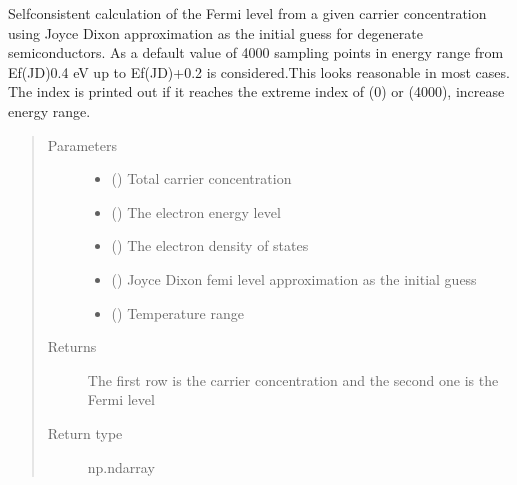\documentclass[letterpaper,10pt,english]{sphinxmanual}
\begin{document}
\begin{fulllineitems}
\label{\detokenize{autosummary/ThermoElectric.fermi_self_consistent:ThermoElectric.fermi_self_consistent}}
\sphinxAtStartPar
Self\sphinxhyphen{}consistent calculation of the Fermi level from a given carrier concentration
using Joyce Dixon approximation as the initial guess for degenerate semiconductors.
As a default value of 4000 sampling points in energy range from Ef(JD)\sphinxhyphen{}0.4 eV up to
Ef(JD)+0.2 is considered.This looks reasonable in most cases. The index is printed out
if it reaches the extreme index of (0) or (4000), increase energy range.
\begin{quote}\begin{description}
\item[{Parameters}] \leavevmode\begin{itemize}
\item {} 
\sphinxAtStartPar
{} () \textendash{} Total carrier concentration

\item {} 
\sphinxAtStartPar
{} () \textendash{} The electron energy level

\item {} 
\sphinxAtStartPar
{} () \textendash{} The electron density of states

\item {} 
\sphinxAtStartPar
{} () \textendash{} Joyce Dixon femi level approximation as the initial guess

\item {} 
\sphinxAtStartPar
{} () \textendash{} Temperature range

\end{itemize}

\item[{Returns}] \leavevmode
\sphinxAtStartPar
{} \textendash{} The first row is the carrier concentration and the second one is the Fermi level

\item[{Return type}] \leavevmode
\sphinxAtStartPar
np.ndarray

\end{description}\end{quote}

\end{fulllineitems}
\end{document}
